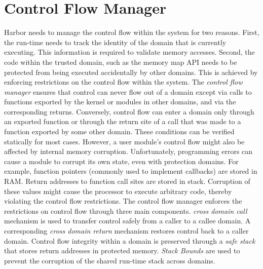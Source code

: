 %
\section{Control Flow Manager}
\label{sec:cfmgr}
%
Harbor needs to manage the control flow within the system for two
reasons.
%
First, the run-time needs to track the identity of the domain
that is currently executing.
%
This information is required to validate memory accesses.
%
Second, the code within the trusted domain, such as the memory map API
needs to be protected from being executed accidentally by other
domains.
%
This is achieved by enforcing restrictions on the control flow within
the system.
%
The \emph{control flow manager} ensures that control can never flow out of
a domain except via calls to functions exported by the kernel or modules in
other domains, and via the corresponding returns.
%
Conversely, control flow can enter a domain only through an exported
function or through the return site of a call that was made to a
function exported by some other domain.
%
These conditions can be verified statically for most cases.
%
However, a user module's control flow might also be affected by internal memory
corruption.
%
Unfortunately, programming errors can cause a module to corrupt its own state, even with
protection domains.
%
%
%
For example, function pointers (commonly used to implement callbacks)
are stored in RAM.
%
Return addresses to function call sites are stored in stack.
%
Corruption of these values might cause the processor to execute
arbitrary code, thereby violating the control flow restrictions.
%
%
%
%
%
The control flow manager enforces the restrictions on control flow
through three main components.
%
\emph{cross domain call} mechanism is used
to transfer control safely from a caller to a callee domain.
%
A corresponding \emph{cross domain return} mechanism restores control back to
a caller domain. 
%
Control flow integrity within a domain is preserved through a \emph{safe stack}
that stores return addresses in protected memory.
%
\emph{Stack Bounds} are used to prevent the corruption of the shared
run-time stack across domains.
%
